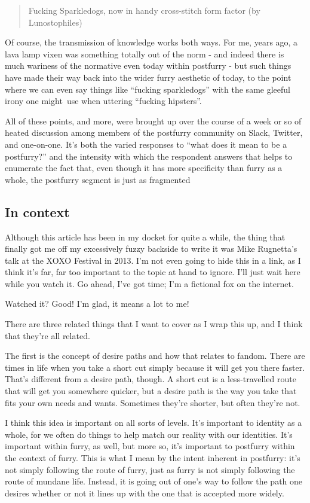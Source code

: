 \begin{quote}
Fucking Sparkledogs, now in handy cross-stitch form factor (by
Lunostophiles)
\end{quote}

Of course, the transmission of knowledge works both ways. For me, years
ago, a lava lamp vixen was something totally out of the norm - and
indeed there is much wariness of the normative even today within
postfurry - but such things have made their way back into the wider
furry aesthetic of today, to the point where we can even say things like
``fucking sparkledogs'' with the same gleeful irony one might~use when
uttering ``fucking hipsters''.

All of these points, and more, were brought up over the course of a week
or so of heated discussion among members of the postfurry community on
Slack, Twitter, and one-on-one. It's both the varied responses to ``what
does it mean to be a postfurry?'' and the intensity with which the
respondent answers that helps to enumerate the fact that, even though it
has more specificity than furry as a whole, the postfurry segment is
just as fragmented

\subsection{In context}\label{in-context}

Although this article has been in my docket for quite a while, the thing
that finally got me off my excessively fuzzy backside to write it was
Mike Rugnetta's talk at the XOXO Festival in 2013. I'm not even going to
hide this in a link, as I think it's far, far too important to the topic
at hand to ignore. I'll just wait here while you watch it. Go ahead,
I've got time; I'm a fictional fox on the internet.

Watched it? Good! I'm glad, it means a lot to me!

There are three related things that I want to cover as I wrap this up,
and I think that they're all related.

The first is the concept of desire paths and how that relates to fandom.
There are times in life when you take a short cut simply because it will
get you there faster. That's different from a desire path, though. A
short cut is a less-travelled route that will get you somewhere quicker,
but a desire path is the way you take that fits your own needs and
wants. Sometimes they're shorter, but often they're not.

I think this idea is important on all sorts of levels. It's important to
identity as a whole, for we often do things to help match our reality
with our identities. It's important within furry, as well, but more so,
it's important to postfurry within the context of furry. This is what I
mean by the intent inherent in postfurry: it's not simply following the
route of furry, just as furry is not simply following the route of
mundane life. Instead, it is going out of one's way to follow the path
one desires whether or not it lines up with the one that is accepted
more widely.

